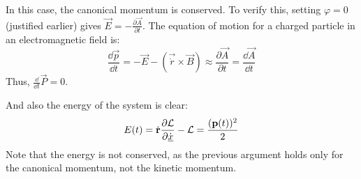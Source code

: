 In this case, the canonical momentum is conserved. 
To verify this, setting $\varphi=0$ (justified earlier) gives $\vec{E} = -\frac{\partial \vec{A}}{\partial t}$. 
The equation of motion for a charged particle in an electromagnetic field \cite{LandauLifschitzBand2} is:
\begin{equation*}
    \frac{\dd\vec{p}}{\dd t} = -\vec{E} - \left(\vec{\dot{r}}\times\vec{B}\right) \approx \frac{\partial \vec{A}}{\partial t} = \frac{\dd \vec{A}}{\dd t}   %
\end{equation*}
Thus, $\frac{\dd}{\dd t}\vec{P}=0$.

And also the energy of the system is clear:
\begin{equation}
    E(t) = \dot{\mathbf{r}}\frac{\partial \mathcal{L}}{\partial \dot{\underline{x}}}-\mathcal{L} = \frac{(\mathbf{p}(t))^2}{2} \label{eq:energy}
\end{equation}
Note that the energy is not conserved, as the previous argument holds only for the canonical momentum, not the kinetic momentum.


